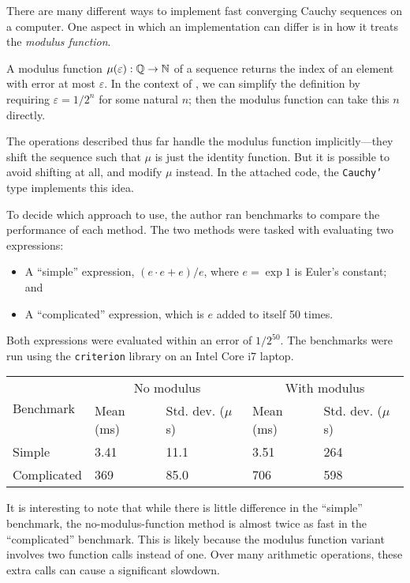 \documentclass[leqno]{report}
\begin{document}
There are many different ways to implement fast converging Cauchy sequences on a computer. One aspect in which an implementation can differ is in how it treats the \textit{modulus function}.

A modulus function $\mu(\varepsilon) : \mathbb{Q} \rightarrow \mathbb{N}$ of a sequence returns the index of an element with error at most $\varepsilon$. In the context of \FCCS, we can simplify the definition by requiring $\varepsilon = 1/2^n$ for some natural $n$; then the modulus function can take this $n$ directly.

The \FCCS{} operations described thus far handle the modulus function implicitly---they shift the sequence such that $\mu$ is just the identity function. But it is possible to avoid shifting at all, and modify $\mu$ instead. In the attached code, the \texttt{Cauchy'} type implements this idea.

To decide which approach to use, the author ran benchmarks to compare the performance of each method. The two methods were tasked with evaluating two expressions:
\begin{itemize}
    \item A ``simple'' expression, $(e \cdot e + e) / e$, where $e = \exp 1$ is Euler's constant; and
    \item A ``complicated'' expression, which is $e$ added to itself 50 times.
\end{itemize}

Both expressions were evaluated within an error of $1/2^{50}$. The benchmarks were run using the \texttt{criterion} library on an Intel Core i7 laptop.

\begin{center} \begin{tabular}{lllll}
    \toprule
    \multirow{2}{*}{Benchmark} &
    \multicolumn{2}{c}{No modulus} &
    \multicolumn{2}{c}{With modulus} \\
    \cmidrule(l){2-5}
    & Mean (ms) & Std. dev. ($\mu$s) & Mean (ms) & Std. dev. ($\mu$s) \\
    \midrule
    Simple & 3.41 & 11.1 & 3.51 & 264 \\
    Complicated & 369 & 85.0 & 706 & 598 \\
    \bottomrule
\end{tabular} \end{center}

It is interesting to note that while there is little difference in the ``simple'' benchmark, the no-modulus-function method is almost twice as fast in the ``complicated'' benchmark. This is likely because the modulus function variant involves two function calls instead of one. Over many arithmetic operations, these extra calls can cause a significant slowdown.
\end{document}

